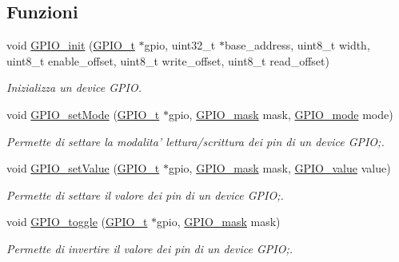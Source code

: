 \subsection*{Funzioni}
\begin{DoxyCompactItemize}
\item 
void \hyperlink{group___g_p_i_o___g_r_o_u_p_gad3d8f07163fbe858774e769eb6d755db}{G\+P\+I\+O\+\_\+init} (\hyperlink{struct_g_p_i_o__t}{G\+P\+I\+O\+\_\+t} $\ast$gpio, uint32\+\_\+t $\ast$base\+\_\+address, uint8\+\_\+t width, uint8\+\_\+t enable\+\_\+offset, uint8\+\_\+t write\+\_\+offset, uint8\+\_\+t read\+\_\+offset)
\begin{DoxyCompactList}\small\item\em Inizializza un device G\+P\+I\+O. \end{DoxyCompactList}\item 
void \hyperlink{group___g_p_i_o___g_r_o_u_p_ga3f18ccfbb70d89cc7e2b06712dd82eb7}{G\+P\+I\+O\+\_\+set\+Mode} (\hyperlink{struct_g_p_i_o__t}{G\+P\+I\+O\+\_\+t} $\ast$gpio, \hyperlink{group___g_p_i_o___g_r_o_u_p_ga6d5aef8a8a54ee2f602d47252ff66595}{G\+P\+I\+O\+\_\+mask} mask, \hyperlink{group___g_p_i_o___g_r_o_u_p_ga894e6ae857ed4a9aedd04fff44a6770e}{G\+P\+I\+O\+\_\+mode} mode)
\begin{DoxyCompactList}\small\item\em Permette di settare la modalita' lettura/scrittura dei pin di un device G\+P\+I\+O;. \end{DoxyCompactList}\item 
void \hyperlink{group___g_p_i_o___g_r_o_u_p_ga86b232ed74eacf9aa723cb1d7917a156}{G\+P\+I\+O\+\_\+set\+Value} (\hyperlink{struct_g_p_i_o__t}{G\+P\+I\+O\+\_\+t} $\ast$gpio, \hyperlink{group___g_p_i_o___g_r_o_u_p_ga6d5aef8a8a54ee2f602d47252ff66595}{G\+P\+I\+O\+\_\+mask} mask, \hyperlink{group___g_p_i_o___g_r_o_u_p_ga495d9a7aa735fe416a3f110337c54967}{G\+P\+I\+O\+\_\+value} value)
\begin{DoxyCompactList}\small\item\em Permette di settare il valore dei pin di un device G\+P\+I\+O;. \end{DoxyCompactList}\item 
void \hyperlink{group___g_p_i_o___g_r_o_u_p_ga2f516854e98cd048d4d1ee6f86261f8c}{G\+P\+I\+O\+\_\+toggle} (\hyperlink{struct_g_p_i_o__t}{G\+P\+I\+O\+\_\+t} $\ast$gpio, \hyperlink{group___g_p_i_o___g_r_o_u_p_ga6d5aef8a8a54ee2f602d47252ff66595}{G\+P\+I\+O\+\_\+mask} mask)
\begin{DoxyCompactList}\small\item\em Permette di invertire il valore dei pin di un device G\+P\+I\+O;. \end{DoxyCompactList}\item 

\end{DoxyCompactItemize}
